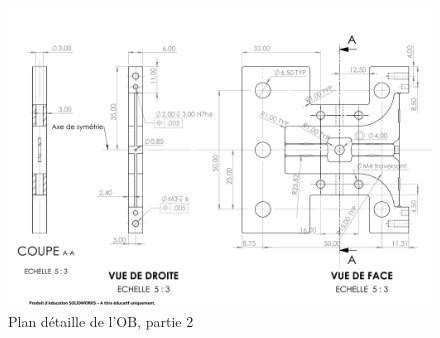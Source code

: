 \begin{landscape}
\begin{figure}[!h]
\begin{center}
\includegraphics[page=2,trim={0.5cm 0cm 0cm 2cm},clip,scale=0.75]{../Chap3/Figure/bloc_APX4_final_6mm_paysageA4.pdf}
\end{center}
\caption{Plan détaille de l'OB, partie 2}
\label{fig:Plan_OB_détaillé_2}
\end{figure}
\end{landscape}